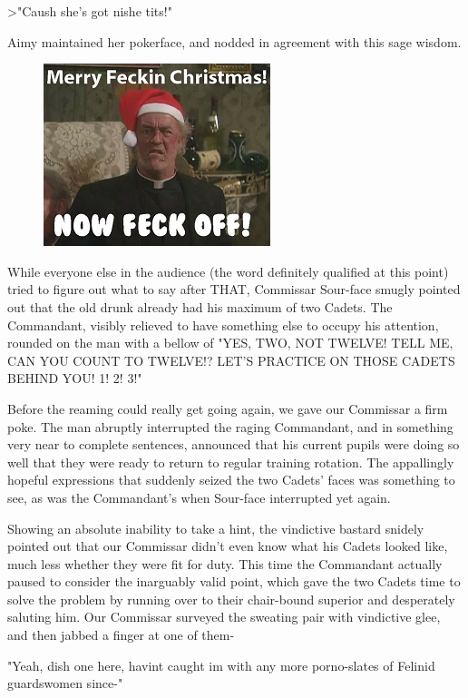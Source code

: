 >"Caush she's got nishe tits!" 

Aimy maintained her pokerface, and nodded in agreement with this sage wisdom.

\begin{figure}
	\begin{center}
		\includegraphics[width=\figwidth]{pics/21/58.png}
	\end{center}
\end{figure}
While everyone else in the audience (the word definitely qualified at this point) tried to figure out what to say after THAT, Commissar Sour-face smugly pointed out that the old drunk already had his maximum of two Cadets. 
The Commandant, visibly relieved to have something else to occupy his attention, rounded on the man with a bellow of "YES, TWO, NOT TWELVE! 
TELL ME, CAN YOU COUNT TO TWELVE!? 
LET'S PRACTICE ON THOSE CADETS BEHIND YOU! 
1! 
2! 
3!"

Before the reaming could really get going again, we gave our Commissar a firm poke. 
The man abruptly interrupted the raging Commandant, and in something very near to complete sentences, announced that his current pupils were doing so well that they were ready to return to regular training rotation. 
The appallingly hopeful expressions that suddenly seized the two Cadets' faces was something to see, as was the Commandant's when Sour-face interrupted yet again.

Showing an absolute inability to take a hint, the vindictive bastard snidely pointed out that our Commissar didn't even know what his Cadets looked like, much less whether they were fit for duty. 
This time the Commandant actually paused to consider the inarguably valid point, which gave the two Cadets time to solve the problem by running over to their chair-bound superior and desperately saluting him. 
Our Commissar surveyed the sweating pair with vindictive glee, and then jabbed a finger at one of them-

"Yeah, dish one here, havint caught im with any more porno-slates of Felinid guardswomen since-"

